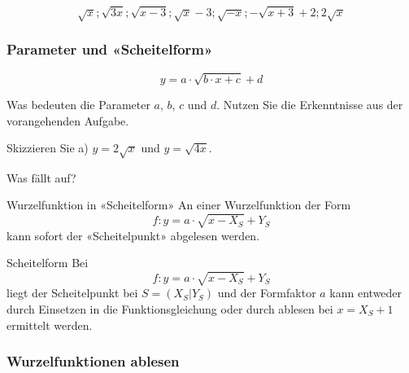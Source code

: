 $$\sqrt{x}; \sqrt{3x}; \sqrt{x-3}; \sqrt{x} - 3;
\sqrt{-x}; -\sqrt{x+3} + 2; 2\sqrt{x}$$

\newpage


\subsubsection{Parameter und «Scheitelform»}
$$y = a\cdot{} \sqrt{b\cdot{}x + c} + d$$

Was bedeuten die Parameter $a$, $b$, $c$ und $d$. Nutzen Sie die
Erkenntnisse aus der vorangehenden Aufgabe.


Skizzieren Sie a) $y=2\sqrt{x}$ und $y=\sqrt{4x}$.

Was fällt auf?



\begin{definition}{Wurzelfunktion in «Scheitelform»}{}
  An einer Wurzelfunktion der Form
  $$f: y = a\cdot{}\sqrt{x-X_S} + Y_S$$
  kann sofort der «Scheitelpunkt» abgelesen werden.
\end{definition}

\begin{gesetz}{Scheitelform}
Bei  $$f: y = a\cdot{}\sqrt{x-X_S} + Y_S$$
liegt der Scheitelpunkt bei $S=(X_S | Y_S)$ und der Formfaktor $a$ kann
entweder durch Einsetzen in die Funktionsgleichung oder durch ablesen
bei $x=X_S+1$ ermittelt werden.
\end{gesetz}

\newpage
\newpage



\subsubsection{Wurzelfunktionen ablesen}


